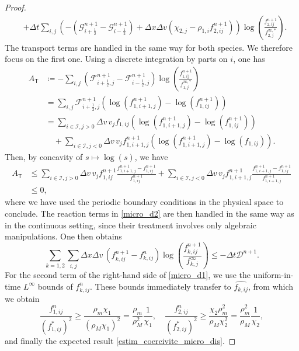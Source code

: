 \documentclass[reqno]{amsart}
\newcommand{\Dt}{\Delta t}
\newcommand{\Dx}{\Delta x}
\newcommand{\Dv}{\Delta v}
\newcommand{\TT}{\mathsf{T}}
\newcommand{\II}{\mathcal{I}}
\newcommand{\iph}{{i+\frac{1}{2}}}
\newcommand{\imh}{{i-\frac{1}{2}}}
\numberwithin{equation}{section}
\begin{document}
\begin{proof}
\begin{align}
        &+ \Dt\sum_{i,j}\left(-(\mathcal{G}^{n+1}_{\iph}-\mathcal{G}^{n+1}_{\imh})+\Dx\Dv(\chi_{2,j}-\rho_{1,i}f^{n+1}_{2,ij})\right)\log\left(\frac{f^{n+1}_{2,ij}}{f_{2,j}^{\infty,*}}\right).\nonumber
    \end{align}
    The transport terms are handled in the same way for both species. We therefore focus on the first one. Using a discrete integration by parts on $i$, one has 
    \begin{equation*}
    \begin{aligned}
     A_\TT &\coloneq  -\sum_{i,j}(\mathcal{F}^{n+1}_{\iph,j}-\mathcal{F}^{n+1}_{\imh,j})\log\left(\frac{f^{n+1}_{1,ij}}{f_{1,j}^{\infty,*}}\right) \\
     &= \sum_{i,j} \mathcal{F}^{n+1}_{\iph,j}\left(\log\left(f^{n+1}_{1,i+1,j}\right)-\log\left(f^{n+1}_{1,ij}\right)\right)\\
        &= \sum_{i\in\II, j>0}\Dv\, v_j f_{1,ij}\left(\log\left(f^{n+1}_{1,i+1,j}\right)-\log\left(f^{n+1}_{1,ij}\right)\right)\\
        &\quad+ \sum_{i\in\II, j<0}\Dv\, v_j f^{n+1}_{1,i+1,j} \left(\log\left(f^{n+1}_{1,i+1,j}\right)-\log\left(f_{1,ij}\right)\right).
    \end{aligned}
    \end{equation*}
    Then, by concavity of $s\mapsto\log(s)$, we have
    \begin{equation*}
        \begin{aligned}
            A_\TT       &\leq \sum_{i\in\II, j>0}\Dv\, v_j f_{1,ij}^{n+1}\frac{f_{1,i+1,j}^{n+1}-f_{1,ij}^{n+1}}{f_{1,ij}^{n+1}}
            + \sum_{i\in\II, j<0}\Dv\, v_j f_{1,i+1,j}^{n+1} \frac{f_{1,i+1,j}^{n+1}-f_{1,ij}^{n+1}}{f_{1,i+1,j}^{n+1}}\\
            &\leq 0,
        \end{aligned}
    \end{equation*}
    where we have used the periodic boundary conditions in the physical space to conclude. The reaction terms in \eqref{micro_d2} are then handled in the same way as in the continuous setting, since their treatment involves only algebraic manipulations. One then obtains
    \begin{equation*}
    \sum_{k=1,2}\sum_{i,j}\Dx \Dv\, (f_{k,ij}^{n+1}-f_{k,ij}^n)\log\left(\frac{f_{k,ij}^{n+1}}{f_{k,j}^\infty}\right) \leq -\Delta t \mathcal{D}^{n+1}.
    \end{equation*}
    For the second term of the right-hand side of \eqref{micro_d1}, we use the uniform-in-time $L^\infty$ bounds of $f_{k,ij}^n$. These bounds immediately transfer to $\widehat{f_{k,ij}}$, from which we obtain
    \[\frac{f_{1,ij}^n}{(f_{1,ij}^*)^2}\geq \frac{\rho_m\chi_1}{(\rho_M\chi_1)^2}=\frac{\rho_m}{\rho_M^2}\frac{1}{\chi_1}, \quad \frac{f_{2,ij}^n}{(f_{2,ij}^*)^2}\geq \frac{\chi_2\rho_m^2}{\rho_M\chi_2^2}=\frac{\rho_m^2}{\rho_M}\frac{1}{\chi_2},\]
    and finally the expected result \eqref{estim_coercivite_micro_dis}.
\end{proof}
\end{document}
